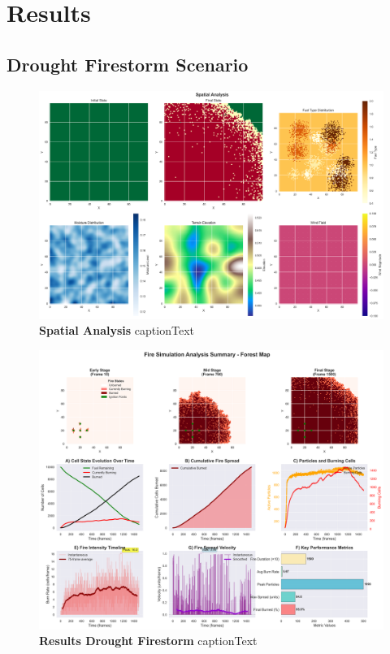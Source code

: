 \section{Results}
\subsection{Drought Firestorm Scenario}
\begin{figure}[H]
	\centering
	\includegraphics[width=\textwidth]{media/spatial_analysis_df.png}
	\caption{
		\textbf{Spatial Analysis}
		captionText
	}
	\label{fig:spatial_df}
\end{figure}

\begin{figure}[H]
	\centering
	\includegraphics[width=\textwidth]{media/report_summary_df.png}
	\caption{
		\textbf{Results Drought Firestorm}
		captionText
	}
	\label{fig:res_df}
\end{figure}

